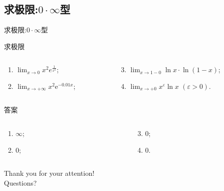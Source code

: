 \documentclass[
10pt,
aspectratio=43,
]{beamer}
\begin{document}
\subsection{求极限:$\displaystyle0\cdot\infty$型}
\begin{frame}{求极限:$\displaystyle0\cdot\infty$型}
	\everymath{\displaystyle}
	\begin{block}{求极限}
		\begin{columns}[t]
			\begin{column}{0.5\textwidth}
				\begin{enumerate}
					\item $\lim_{x \rightarrow 0} x^2 e^{\frac{1}{x^2}}$;
					\item $\lim_{x \rightarrow +\infty} x^2 \mathrm{e}^{-0.01 x}$;
				\end{enumerate}
			\end{column}
			\begin{column}{0.5\textwidth}
				\begin{enumerate}
					\setcounter{enumi}{2}
					\item $\lim_{x \rightarrow 1-0} \ln x \cdot \ln (1-x)$;
					\item $\lim_{x \rightarrow +0} x^{\varepsilon} \ln x \,\,(\varepsilon>0)$.
				\end{enumerate}
			\end{column}
		\end{columns}
	\end{block}

	\begin{exampleblock}{答案}
		\begin{columns}[t]
			\begin{column}{0.5\textwidth}
				\begin{enumerate}
					\pause
					\item $\infty$;
					\item $0$;
				\end{enumerate}
			\end{column}
			\begin{column}{0.5\textwidth}
				\begin{enumerate}
					\setcounter{enumi}{2}
					\pause
					\item $0$;
					\item $0$.
				\end{enumerate}
			\end{column}
		\end{columns}
	\end{exampleblock}
\end{frame}


\begin{frame}[plain]
	\vfill
	\centering
	{
		\centering \Huge \color{white} Thank you for your attention!\\[10pt]Questions?
	}
	\vfill
\end{frame}
\end{document}
